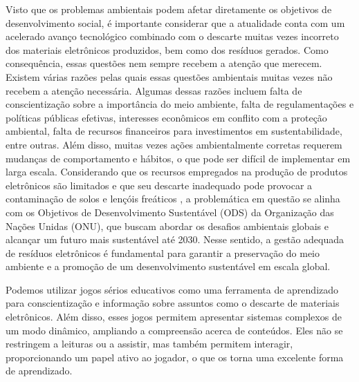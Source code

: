 \par
Visto que os problemas ambientais podem afetar diretamente os objetivos de desenvolvimento social, é importante considerar que a atualidade conta com um acelerado avanço tecnológico combinado com o descarte muitas vezes incorreto dos materiais eletrônicos produzidos, bem como dos resíduos gerados. Como consequência, essas questões nem sempre recebem a atenção que merecem. Existem várias razões pelas quais essas questões ambientais muitas vezes não recebem a atenção necessária. Algumas dessas razões incluem falta de conscientização sobre a importância do meio ambiente, falta de regulamentações e políticas públicas efetivas, interesses econômicos em conflito com a proteção ambiental, falta de recursos financeiros para investimentos em sustentabilidade, entre outras. Além disso, muitas vezes ações ambientalmente corretas requerem mudanças de comportamento e hábitos, o que pode ser difícil de implementar em larga escala.
Considerando que os recursos empregados na produção de produtos eletrônicos são limitados e que seu descarte inadequado pode provocar a contaminação de solos e lençóis freáticos \cite{eWasteContamination}, a problemática em questão se alinha com os Objetivos de Desenvolvimento Sustentável (ODS) da Organização das Nações Unidas (ONU), que buscam abordar os desafios ambientais globais e alcançar um futuro mais sustentável até 2030. Nesse sentido, a gestão adequada de resíduos eletrônicos é fundamental para garantir a preservação do meio ambiente e a promoção de um desenvolvimento sustentável em escala global.
\par
Podemos utilizar jogos sérios educativos como uma ferramenta de aprendizado para conscientização e informação sobre assuntos como o descarte de materiais eletrônicos. Além disso, esses jogos permitem apresentar sistemas complexos de um modo dinâmico, ampliando a compreensão acerca de conteúdos. Eles não se restringem a leituras ou a assistir, mas também permitem interagir, proporcionando um papel ativo ao jogador, o que os torna uma excelente forma de aprendizado. \cite{Vasconcellos_Carvalho_Barreto_Atella_2017}
\par

